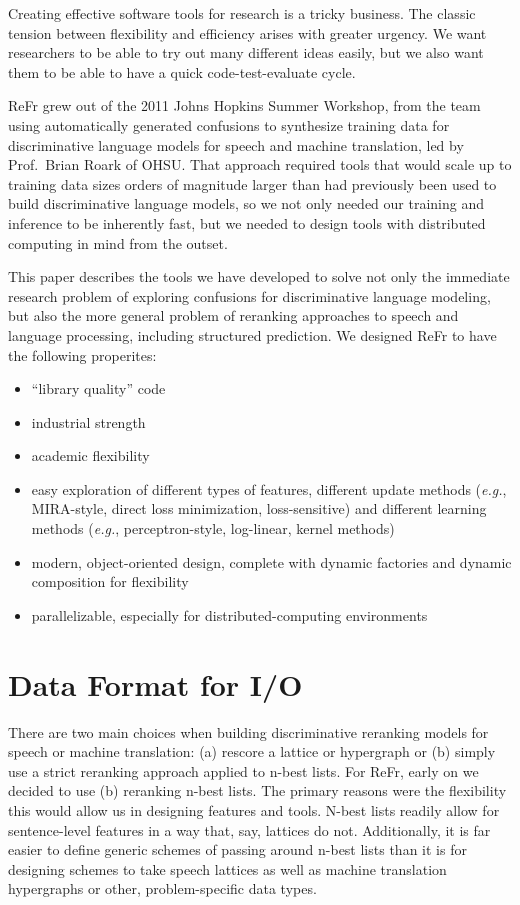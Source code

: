 \documentclass[a4paper]{article}
\begin{document}
Creating effective software tools for research is a tricky business.
The classic tension between flexibility and efficiency arises with
greater urgency. We want researchers to be able to try out many
different ideas easily, but we also want them to be able to have a
quick code-test-evaluate cycle.

ReFr grew out of the 2011 Johns Hopkins Summer Workshop, from the team
using automatically generated confusions to synthesize training data
for discriminative language models for speech and machine translation,
led by Prof.\ Brian Roark of OHSU.  That approach required tools that
would scale up to training data sizes orders of magnitude larger than
had previously been used to build discriminative language models, so
we not only needed our training and inference to be inherently fast,
but we needed to design tools with distributed computing in mind from
the outset.

This paper describes the tools we have developed to solve not only the
immediate research problem of exploring confusions for discriminative
language modeling, but also the more general problem of reranking
approaches to speech and language processing, including structured
prediction. We designed ReFr to have the following properites:
\vspace{-0.1in}
\begin{itemize}[noitemsep]
\item ``library quality'' code
\item industrial strength
\item academic flexibility
\item easy exploration of different types of features, different
  update methods (\emph{e.g.}, MIRA-style, direct loss minimization,
  loss-sensitive) and different learning methods (\emph{e.g.},
  perceptron-style, log-linear, kernel methods)
\item modern, object-oriented design, complete with dynamic factories
  and dynamic composition for flexibility
\item parallelizable, especially for distributed-computing
  environments
\end{itemize}
\section{Data Format for I/O}

There are two main choices when building discriminative reranking
models for speech or machine translation: (a) rescore a lattice or
hypergraph or (b) simply use a strict reranking approach applied to
n-best lists. For ReFr, early on we decided to use (b) reranking
n-best lists. The primary reasons were the flexibility this would
allow us in designing features and tools. N-best lists readily allow for
sentence-level features in a way that, say, lattices do not.
Additionally, it is far easier to define generic schemes of passing around
n-best lists than it is for designing schemes to take speech lattices as well
as machine translation hypergraphs or other, problem-specific data types.
\end{document}
